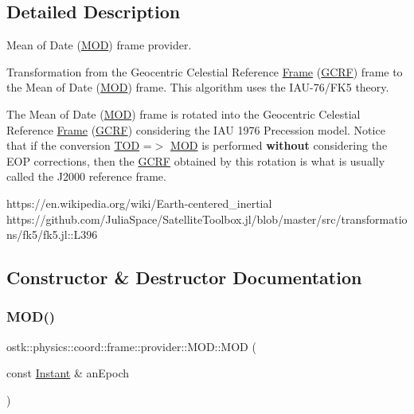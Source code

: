 \subsection{Detailed Description}
Mean of Date (\hyperlink{classostk_1_1physics_1_1coord_1_1frame_1_1provider_1_1_m_o_d}{M\+OD}) frame provider. 

Transformation from the Geocentric Celestial Reference \hyperlink{classostk_1_1physics_1_1coord_1_1_frame}{Frame} (\hyperlink{classostk_1_1physics_1_1coord_1_1frame_1_1provider_1_1_g_c_r_f}{G\+C\+RF}) frame to the Mean of Date (\hyperlink{classostk_1_1physics_1_1coord_1_1frame_1_1provider_1_1_m_o_d}{M\+OD}) frame. This algorithm uses the I\+A\+U-\/76/\+F\+K5 theory.

The Mean of Date (\hyperlink{classostk_1_1physics_1_1coord_1_1frame_1_1provider_1_1_m_o_d}{M\+OD}) frame is rotated into the Geocentric Celestial Reference \hyperlink{classostk_1_1physics_1_1coord_1_1_frame}{Frame} (\hyperlink{classostk_1_1physics_1_1coord_1_1frame_1_1provider_1_1_g_c_r_f}{G\+C\+RF}) considering the I\+AU 1976 Precession model. Notice that if the conversion {\ttfamily \hyperlink{classostk_1_1physics_1_1coord_1_1frame_1_1provider_1_1_t_o_d}{T\+OD} =$>$ \hyperlink{classostk_1_1physics_1_1coord_1_1frame_1_1provider_1_1_m_o_d}{M\+OD}} is performed {\bfseries without} considering the E\+OP corrections, then the \hyperlink{classostk_1_1physics_1_1coord_1_1frame_1_1provider_1_1_g_c_r_f}{G\+C\+RF} obtained by this rotation is what is usually called the J2000 reference frame.

https\+://en.wikipedia.\+org/wiki/\+Earth-\/centered\+\_\+inertial https\+://github.com/\+Julia\+Space/\+Satellite\+Toolbox.\+jl/blob/master/src/transformations/fk5/fk5.jl\+::\+L396 

\subsection{Constructor \& Destructor Documentation}
\mbox{\label{classostk_1_1physics_1_1coord_1_1frame_1_1provider_1_1_m_o_d_acba77d3f427fdbbb5753e86acf5edbc7}} 
\subsubsection{\texorpdfstring{M\+O\+D()}{MOD()}}
{\footnotesize\ttfamily ostk\+::physics\+::coord\+::frame\+::provider\+::\+M\+O\+D\+::\+M\+OD (\begin{DoxyParamCaption}\item[{const \hyperlink{classostk_1_1physics_1_1time_1_1_instant}{Instant} \&}]{an\+Epoch }\end{DoxyParamCaption})}

